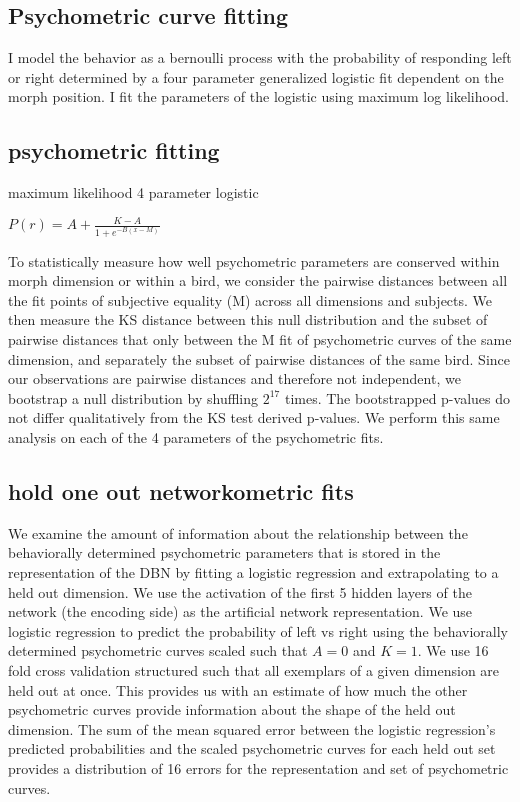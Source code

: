 \subsection*{Psychometric curve fitting}
I model the behavior as a bernoulli process with the probability of responding left or right determined by a four parameter generalized logistic fit dependent on the morph position. I fit the parameters of the logistic using maximum log likelihood.

\subsection*{psychometric fitting}

maximum likelihood 4 parameter logistic

$P(r) = A + \frac{K - A}{1 + e^{-B(x-M)}}$


To statistically measure how well psychometric parameters are conserved within morph dimension or within a bird, we consider the pairwise distances between all the fit points of subjective equality (M) across all dimensions and subjects. We then measure the \ac{KS} distance between this null distribution and the subset of pairwise distances that only between the M fit of psychometric curves of the same dimension, and separately the subset of pairwise distances of the same bird. Since our observations are pairwise distances and therefore not independent, we bootstrap a null distribution by shuffling $2^{17}$ times. The bootstrapped p-values do not differ qualitatively from the KS test derived p-values. We perform this same analysis on each of the 4 parameters of the psychometric fits.

\subsection*{hold one out networkometric fits}

We examine the amount of information about the relationship between the behaviorally determined psychometric parameters that is stored in the representation of the \ac{DBN} by fitting a logistic regression and extrapolating to a held out dimension. We use the activation of the first 5 hidden layers of the network (the encoding side) as the artificial network representation. We use logistic regression to predict the probability of left vs right using the behaviorally determined psychometric curves scaled such that $A=0$ and $K=1$. We use 16 fold cross validation structured such that all exemplars of a given dimension are held out at once. This provides us with an estimate of how much the other psychometric curves provide information about the shape of the held out dimension. The sum of the mean squared error between the logistic regression's predicted probabilities and the scaled psychometric curves for each held out set provides a distribution of 16 errors for the representation and set of psychometric curves.

